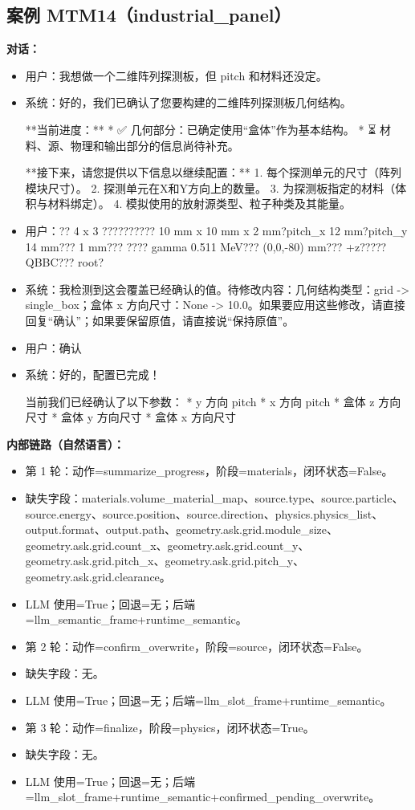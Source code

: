 \documentclass[11pt]{ctexart}
\begin{document}
\subsection{案例 MTM14（industrial\_panel）}
\textbf{对话：}
\begin{itemize}
\item 用户：我想做一个二维阵列探测板，但 pitch 和材料还没定。
\item 系统：好的，我们已确认了您要构建的二维阵列探测板几何结构。

**当前进度：**
*   ✅ 几何部分：已确定使用“盒体”作为基本结构。
*   ⏳ 材料、源、物理和输出部分的信息尚待补充。

**接下来，请您提供以下信息以继续配置：**
1.  每个探测单元的尺寸（阵列模块尺寸）。
2.  探测单元在X和Y方向上的数量。
3.  为探测板指定的材料（体积与材料绑定）。
4.  模拟使用的放射源类型、粒子种类及其能量。
\item 用户：?? 4 x 3 ?????????? 10 mm x 10 mm x 2 mm?pitch\_x 12 mm?pitch\_y 14 mm??? 1 mm??? ???? gamma 0.511 MeV??? (0,0,-80) mm??? +z????? QBBC??? root?
\item 系统：我检测到这会覆盖已经确认的值。待修改内容：几何结构类型：grid -> single\_box；盒体 x 方向尺寸：None -> 10.0。如果要应用这些修改，请直接回复“确认”；如果要保留原值，请直接说“保持原值”。
\item 用户：确认
\item 系统：好的，配置已完成！

当前我们已经确认了以下参数：
*   y 方向 pitch
*   x 方向 pitch
*   盒体 z 方向尺寸
*   盒体 y 方向尺寸
*   盒体 x 方向尺寸
\end{itemize}
\textbf{内部链路（自然语言）：}
\begin{itemize}
\item 第 1 轮：动作=summarize\_progress，阶段=materials，闭环状态=False。
\item 缺失字段：materials.volume\_material\_map、source.type、source.particle、source.energy、source.position、source.direction、physics.physics\_list、output.format、output.path、geometry.ask.grid.module\_size、geometry.ask.grid.count\_x、geometry.ask.grid.count\_y、geometry.ask.grid.pitch\_x、geometry.ask.grid.pitch\_y、geometry.ask.grid.clearance。
\item LLM 使用=True；回退=无；后端=llm\_semantic\_frame+runtime\_semantic。
\item 第 2 轮：动作=confirm\_overwrite，阶段=source，闭环状态=False。
\item 缺失字段：无。
\item LLM 使用=True；回退=无；后端=llm\_slot\_frame+runtime\_semantic。
\item 第 3 轮：动作=finalize，阶段=physics，闭环状态=True。
\item 缺失字段：无。
\item LLM 使用=True；回退=无；后端=llm\_slot\_frame+runtime\_semantic+confirmed\_pending\_overwrite。
\end{itemize}
\end{document}
